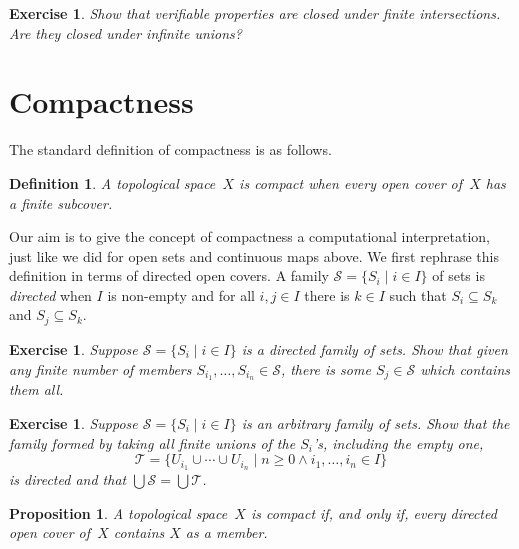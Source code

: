 \documentclass[a4paper,11pt]{article}
\newtheorem{proposition}[theorem]{Proposition}
\newtheorem{exercise}[theorem]{Exercise}
\newtheorem{definition}[theorem]{Definition}
\newcommand{\set}[1]{\{#1\}}
\newcommand{\such}{\mid}
\begin{document}
\begin{exercise}
  Show that verifiable properties are closed under finite
  intersections. Are they closed under infinite unions?
\end{exercise}

\section{Compactness}
\label{sec:compactness}

The standard definition of compactness is as follows.

\begin{definition}
  A topological space~$X$ is \emph{compact} when every open cover
  of~$X$ has a finite subcover.
\end{definition}

Our aim is to give the concept of compactness a computational
interpretation, just like we did for open sets and continuous maps
above. We first rephrase this definition in terms of directed open
covers. A family $\mathcal{S} = \set{S_i \such i \in I}$ of sets is
\emph{directed} when $I$ is non-empty and for all $i, j \in I$ there
is $k \in I$ such that $S_i \subseteq S_k$ and $S_j \subseteq S_k$.

\begin{exercise}
  Suppose $\mathcal{S} = \set{S_i \such i \in I}$ is a directed family
  of sets. Show that given any finite number of members $S_{i_1},
  \ldots, S_{i_n} \in \mathcal{S}$, there is some $S_j \in
  \mathcal{S}$ which contains them all.
\end{exercise}

\begin{exercise}
  Suppose $\mathcal{S} = \set{S_i \such i \in I}$ is an arbitrary
  family of sets. Show that the family formed by taking all finite
  unions of the $S_i$'s, including the empty one,
  \begin{equation*}
    \mathcal{T} = \set{U_{i_1} \cup \cdots \cup U_{i_n} \such
      n \geq 0 \land i_1, \ldots, i_n \in I}
  \end{equation*}
  is directed and that $\bigcup \mathcal{S} = \bigcup \mathcal{T}$.
\end{exercise}


\begin{proposition}
  \label{proposition:compact-directed-cover}
  A topological space~$X$ is \emph{compact} if, and only if, every
  directed open cover of~$X$ contains $X$ as a member.
\end{proposition}
\end{document}
